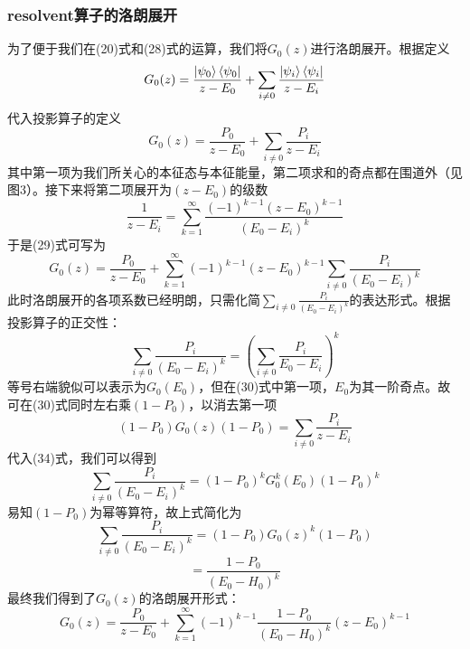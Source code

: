 \documentclass[12pt, a4paper, oneside]{ctexart}
\begin{document}
\subsubsection{resolvent算子的洛朗展开}
为了便于我们在(20)式和(28)式的运算，我们将$G_0(z)$进行洛朗展开。根据定义
\begin{equation}
    G_0(z)=\frac{\ket{\psi_0}\bra{\psi_0}}{z-E_0}+\sum_{i\neq 0}\frac{\ket{\psi_i}\bra{\psi_i}}{z-E_i}
\end{equation}
代入投影算子的定义
\begin{equation}
    G_0(z)=\frac{P_0}{z-E_0}+\sum_{i\neq 0}\frac{P_i}{z-E_i}
\end{equation}
其中第一项为我们所关心的本征态与本征能量，第二项求和的奇点都在围道外（见图3）。接下来将第二项展开为$(z-E_0)$的级数
\begin{equation}
    \frac{1}{z-E_i}=\sum_{k=1}^{\infty}\frac{(-1)^{k-1}(z-E_0)^{k-1}}{(E_0-E_i)^k}
\end{equation}
于是(29)式可写为
\begin{equation}
    G_0(z)=\frac{P_0}{z-E_0}+\sum_{k=1}^{\infty}(-1)^{k-1}(z-E_0)^{k-1}\sum_{i\neq 0}\frac{P_i}{(E_0-E_i)^k}
\end{equation}
此时洛朗展开的各项系数已经明朗，只需化简$\sum_{i\neq 0}\frac{P_i}{(E_0-E_i)^k}$的表达形式。根据投影算子的正交性：
\begin{equation}
    \sum_{i\neq 0}\frac{P_i}{(E_0-E_i)^k}=(\sum_{i\neq 0}\frac{P_i}{E_0-E_i})^k
\end{equation}
等号右端貌似可以表示为$G_0(E_0)$，但在(30)式中第一项，$E_0$为其一阶奇点。故可在(30)式同时左右乘$(1-P_0)$，以消去第一项
\begin{equation}
    (1-P_0)G_0(z)(1-P_0)=\sum_{i\neq 0}\frac{P_i}{z-E_i}
\end{equation}
代入(34)式，我们可以得到
\begin{equation}
    \sum_{i\neq 0}\frac{P_i}{(E_0-E_i)^k}=(1-P_0)^kG_0^k(E_0)(1-P_0)^k
\end{equation}
易知$(1-P_0)$为幂等算符，故上式简化为
\begin{equation}
    \sum_{i\neq 0}\frac{P_i}{(E_0-E_i)^k}=(1-P_0)G_0(z)^k(1-P_0)
\end{equation}
\begin{equation}
    =\frac{1-P_0}{(E_0-H_0)^k}
\end{equation}
最终我们得到了$G_0(z)$的洛朗展开形式：
\begin{equation}
    G_0(z)=\frac{P_0}{z-E_0}+\sum_{k=1}^{\infty}(-1)^{k-1}\frac{1-P_0}{(E_0-H_0)^k}(z-E_0)^{k-1}
\end{equation}
\end{document}
